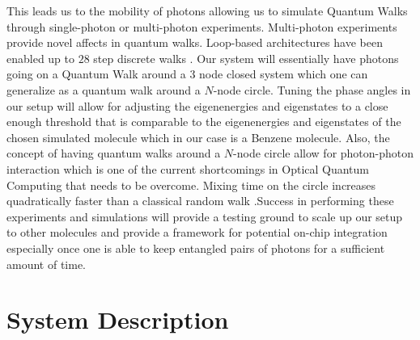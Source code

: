 \indent This leads us to the mobility of photons allowing us to simulate Quantum Walks through single-photon or multi-photon experiments. Multi-photon experiments provide novel affects in quantum walks. Loop-based architectures have been enabled up to $28$ step discrete walks \cite{PhysRevLett.104.050502}. Our system will essentially have photons going on a Quantum Walk around a 3 node closed system which one can generalize as a quantum walk around a $N$-node circle. Tuning the phase angles in our setup will allow for adjusting the eigenenergies and eigenstates to a close enough threshold that is comparable to the eigenenergies and eigenstates of the chosen simulated molecule which in our case is a Benzene molecule. Also, the concept of having quantum walks around a $N$-node circle allow for photon-photon interaction which is one of the current shortcomings in Optical Quantum Computing that needs to be overcome. Mixing time on the circle increases quadratically faster than a classical random walk \cite{PhysRevA.95.052338}.Success in performing these experiments and simulations will provide a testing ground to scale up our setup to other molecules and provide a framework for potential on-chip integration especially once one is able to keep entangled pairs of photons for a sufficient amount of time.

\newpage

\chapter{System Description}
